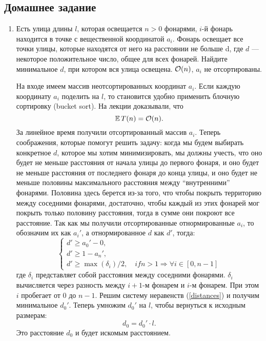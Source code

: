 \subsection{Домашнее задание}
\begin{enumerate}
  \item
    Есть улица длины $l$, которая освещается $n > 0$ фонарями, $i$-й фонарь находится в
    точке с вещественной координатой $a_i$. Фонарь освещает все точки улицы, которые находятся от него на расстоянии не больше d, где $d$ — некоторое
    положительное число, общее для всех фонарей.
    Найдите минимальное $d$, при котором вся улица освещена. $\mathcal{O}(n)$, $a_i$ не отсортированы.

    \begin{solution}
      На входе имеем массив неотсортированных координат $a_i$. Если каждую координату $a_i$ поделить на $l$, то становится удобно применить блочную сортировку (bucket sort). На лекции доказывали, что
      \begin{equation}
        \mathbb{E}\, T(n) = \mathcal{O}(n).
      \end{equation}
      За линейное время получили отсортированный массив $a_i$. Теперь соображения, которые помогут решить задачу: когда мы будем выбирать конкретное $d$, которое мы хотим минимизировать, мы должны учесть, что оно будет не меньше расстояния от начала улицы до первого фонаря, и оно будет не меньше расстояния от последнего фонаря до конца улицы, и оно будет не меньше половины максимального расстояния между ``внутренними'' фонарями. Половина здесь берется из-за того, что чтобы покрыть территорию между соседними фонарями, достаточно, чтобы каждый из этих фонарей мог покрыть только половину расстояния, тогда в сумме они покроют все расстояние. Так как мы получили отсортированные отнормированные $a_i$, то обозначим их как $a_i'$, а отнормированное $d$ как $d'$, тогда:
      \begin{equation} \label{distances}
        \begin{cases}
          d' \geq a_0' - 0, \\
          d' \geq 1 - a_n', \\
          d' \geq \max(\delta_i) / 2, \quad if n > 1 \Rightarrow \forall i \in [0, n - 1]
        \end{cases}
      \end{equation}
      где $\delta_i$ представляет собой расстояния между соседними фонарями. $\delta_i$ вычисляется через разность между $i+1$-м фонарем и $i$-м фонарем. При этом $i$ пробегает от 0 до $n - 1$. Решим систему неравенств (\ref{distances}) и получим минимальное $d_0'$. Теперь умножим $d_0'$ на $l$, чтобы вернуться к исходным размерам:
      \begin{equation}
        d_0 = d_0' \cdot l.
      \end{equation}
      Это расстояние $d_0$ и будет искомым расстоянием.


\end{solution}
\end{enumerate}
